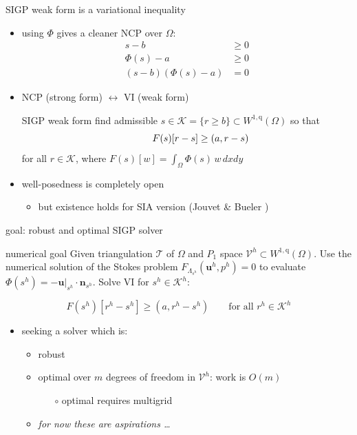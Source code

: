 \documentclass[usepdftitle=false]{beamer}
\newcommand{\bn}{\mathbf{n}}
\newcommand{\bu}{\mathbf{u}}
\newcommand{\ip}[2]{\left(#1,#2\right)}
\newcommand{\qq}{{\text{q}}}
\begin{document}
\begin{frame}{SIGP weak form is a variational inequality}

\begin{itemize}
\item using $\Phi$ gives a cleaner NCP over $\Omega$:
\begin{align*}
s - b &\ge 0 \\
\Phi(s) - a &\ge 0 \\
(s - b) (\Phi(s) - a) &= 0
\end{align*}

\item NCP (strong form) $\leftrightarrow$ VI (weak form)

\begin{block}{SIGP weak form}
find admissible $s \in \mathcal{K} = \{r \ge b\} \subset W^{1,\qq}(\Omega)$ so that
    $$\hspace{10mm} F(s)[r - s] \ge \ip{a}{r-s}$$
for all $r \in \mathcal{K}$, where $F(s)[w] = \int_\Omega \Phi(s)\, w \,dx dy$
\end{block}

\item well-posedness is completely open
    \begin{itemize}
    \item but existence holds for SIA version (Jouvet \& Bueler \cite{JouvetBueler2012})
    \end{itemize}

\end{itemize}

\end{frame}


\begin{frame}{goal: robust and optimal SIGP solver}

\begin{block}{numerical goal}
Given triangulation $\mathcal{T}$ of $\Omega$ and $P_1$ space $\mathcal{V}^h \subset W^{1,\qq}(\Omega)$.  Use the numerical solution of the Stokes problem $F_{\Lambda_{s^h}}(\bu^h,p^h)=0$ to evaluate $\Phi(s^h)=-\bu|_{s^h}\cdot\bn_{s^h}$.  Solve VI for $s^h \in \mathcal{K}^h$:

$$F(s^h)[r^h - s^h] \ge \ip{a}{r^h-s^h} \qquad \text{for all $r^h \in \mathcal{K}^h$}$$
\end{block}

\begin{itemize}
\item seeking a solver which is:
    \begin{itemize}
    \item \alert{robust}
    \item \alert{optimal} over $m$ degrees of freedom in $\mathcal{V}^h$: work is $O(m)$
        \begin{itemize}
        \item[{\color{black} $\circ$}] optimal requires multigrid
        \end{itemize}
    \item<2> \emph{for now these are aspirations \dots}
    \end{itemize}
\end{itemize}
\end{frame}
\end{document}

